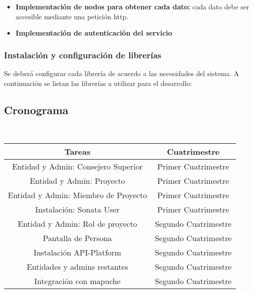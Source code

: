 \begin{itemize}
    \item \textbf{Implementación de nodos para obtener cada dato:} cada dato debe ser accesible mediante una petición http.
    \item \textbf{Implementación de autenticación del servicio}
\end{itemize}

\subsubsection{Instalación y configuración de librerías}%
\label{ssub:instalación_y_configuración_de_librerias}
Se deberá configurar cada librería de acuerdo a las necesidades del sistema.
A continuación se listan las librerías a utilizar para el desarrollo:

\begin{itemize}
    
\end{itemize}

\newpage
\subsection{Cronograma}~\\
\label{sub:cronograma}

\begin{center}

    \begin{tabular}{| c c |}
        \hline
        \textbf{Tareas} & \textbf{Cuatrimestre} \\
        \hline
        Entidad y Admin: Consejero Superior & Primer Cuatrimestre \\
        \hline
        Entidad y Admin: Proyecto & Primer Cuatrimestre \\
        \hline
        Entidad y Admin: Miembro de Proyecto & Primer Cuatrimestre \\
        \hline
        Instalación: Sonata User & Primer Cuatrimestre  \\
        \hline
        Entidad y Admin: Rol de proyecto & Segundo Cuatrimestre \\
        \hline
        Pantalla de Persona & Segundo Cuatrimestre \\
        \hline
        Instalación API-Platform & Segundo Cuatrimestre \\
        \hline
        Entidades y admins restantes & Segundo Cuatrimestre \\
        \hline
        Integración con mapuche & Segundo Cuatrimestre \\
        \hline


    \end{tabular}


\end{center}
